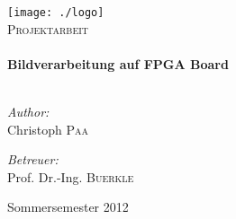 
\begin{titlepage}

\begin{center}


\texttt{[image: ./logo]}\\[1cm]    

\textsc{\Large Projektarbeit}\\[0.5cm]


\HRule \\[0.8cm]
{ \huge \bfseries Bildverarbeitung auf FPGA Board}\\[0.4cm]

\HRule \\[1.5cm]

\begin{minipage}{0.4\textwidth}
\begin{flushleft} \large
\emph{Author:}\\
Christoph \textsc{Paa}
\end{flushleft}
\end{minipage}
\begin{minipage}{0.4\textwidth}
\begin{flushright} \large
\emph{Betreuer:} \\
Prof. Dr.-Ing. \textsc{Buerkle}
\end{flushright}
\end{minipage}

\vfill

{\large {Sommersemester 2012}}

\end{center}

\end{titlepage}